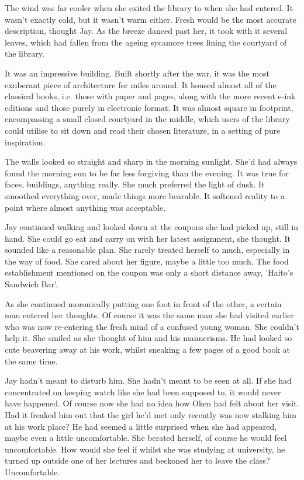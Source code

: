 The wind was far cooler when she exited the library to when she had entered.  It wasn't exactly cold, but it wasn't warm either.  Fresh would be the most accurate description, thought Jay.  As the breeze danced past her, it took with it several leaves, which had fallen from the ageing sycamore trees lining the courtyard of the library.

It was an impressive building.  Built shortly after the war, it was the most exuberant piece of architecture for miles around.  It housed almost all of the classical books, i.e. those with paper and pages, along with the more recent e-ink editions and those purely in electronic format.  It was almost square in footprint, encompassing a small closed courtyard in the middle, which users of the library could utilise to sit down and read their chosen literature, in a setting of pure inspiration.

The walls looked so straight and sharp in the morning sunlight.  She'd had always found the morning sun to be far less forgiving than the evening.  It was true for faces, buildings, anything really. She much preferred the light of dusk.  It smoothed everything over, made things more bearable.  It softened reality to a point where almost anything was acceptable.

Jay continued walking and looked down at the coupons she had picked up, still in hand.  She could go eat and carry on with her latest assignment, she thought.  It sounded like a reasonable plan.  She rarely treated herself to much, especially in the way of food.  She cared about her figure, maybe a little too much,  The food establishment mentioned on the coupon was only a short distance away, 'Haito's Sandwich Bar'.  

As she continued moronically putting one foot in front of the other, a certain man entered her thoughts.  Of course it was the same man she had visited earlier who was now re-entering the fresh mind of a confused young woman.  She couldn't help it.  She smiled as she thought of him and his mannerisms.  He had looked so cute beavering away at his work, whilst sneaking a few pages of a good book at the same time.

Jay hadn't meant to disturb him.  She hadn't meant to be seen at all.  If she had concentrated on keeping watch like she had been supposed to, it would never have happened.  Of course now she had no idea how Oken had felt about her visit.  Had it freaked him out that the girl he'd met only recently was now stalking him at his work place? He had seemed a little surprised when she had appeared, maybe even a little uncomfortable.  She berated herself, of course he would feel uncomfortable.  How would she feel if whilst she was studying at university, he turned up outside one of her lectures and beckoned her to leave the class?  Uncomfortable.

